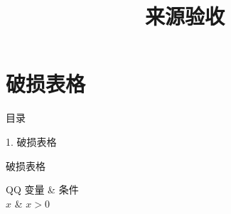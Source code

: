\documentclass[aspectratio=169,10pt,fontset=fandol]{ctexbeamer}
\title{来源验收}
\begin{document}
\section{破损表格}
\begin{frame}[t,fragile]{目录}
\normalsize
{\color{blue}\normalsize 1. 破损表格\par}\vspace{0.3em}
\end{frame}
\begin{frame}[t,fragile]{破损表格}
\normalsize
{\normalsize
\begin{table}
\begin{tabularx}{\linewidth}{QQ}
变量 & 条件 \\
$x$ & $x>0$ \\
\end{tabularx}
\end{table}
}
\end{frame}
\end{document}
